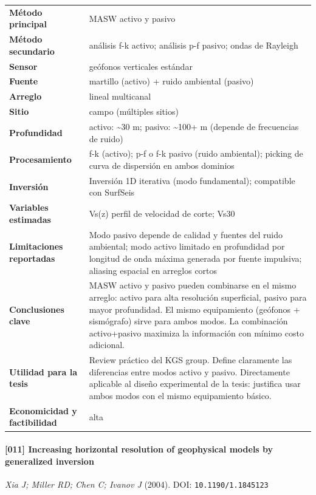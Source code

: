 \begin{center}\scriptsize
\begin{tabularx}{\textwidth}{@{}>{\bfseries}p{3.3cm} X@{}}
\toprule
M\'etodo principal & MASW activo y pasivo \\
M\'etodo secundario & análisis f-k activo; análisis p-f pasivo; ondas de Rayleigh \\
Sensor & geófonos verticales estándar \\
Fuente & martillo (activo) + ruido ambiental (pasivo) \\
Arreglo & lineal multicanal \\
Sitio & campo (múltiples sitios) \\
Profundidad & activo: \textasciitilde{}30 m; pasivo: \textasciitilde{}100+ m (depende de frecuencias de ruido) \\
Procesamiento & f-k (activo); p-f o f-k pasivo (ruido ambiental); picking de curva de dispersión en ambos dominios \\
Inversi\'on & Inversión 1D iterativa (modo fundamental); compatible con SurfSeis \\
Variables estimadas & Vs(z) perfil de velocidad de corte; Vs30 \\
Limitaciones reportadas & Modo pasivo depende de calidad y fuentes del ruido ambiental; modo activo limitado en profundidad por longitud de onda máxima generada por fuente impulsiva; aliasing espacial en arreglos cortos \\
Conclusiones clave & MASW activo y pasivo pueden combinarse en el mismo arreglo: activo para alta resolución superficial, pasivo para mayor profundidad. El mismo equipamiento (geófonos + sismógrafo) sirve para ambos modos. La combinación activo+pasivo maximiza la información con mínimo costo adicional. \\
Utilidad para la tesis & Review práctico del KGS group. Define claramente las diferencias entre modos activo y pasivo. Directamente aplicable al diseño experimental de la tesis: justifica usar ambos modos con el mismo equipamiento básico. \\
Economicidad y factibilidad & alta \\
\bottomrule
\end{tabularx}
\end{center}

\paragraph{[011] Increasing horizontal resolution of geophysical models by generalized inversion} \emph{Xia J; Miller RD; Chen C; Ivanov J} (2004).
{\scriptsize DOI: \texttt{10.1190/1.1845123}}

